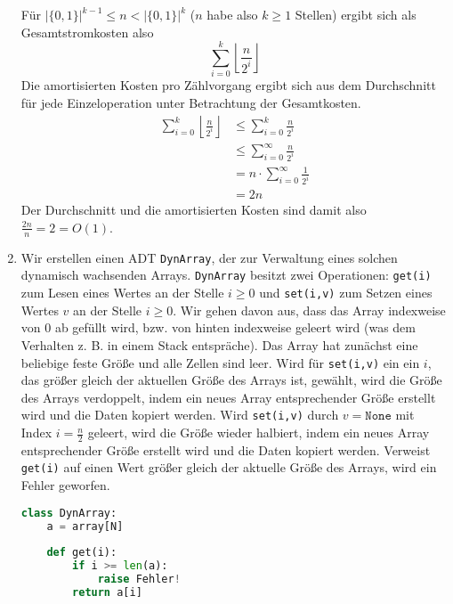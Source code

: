 \documentclass[a4paper,10pt]{article}
\begin{document}
\begin{enumerate}
        Für $\left|\{0,1\}\right|^{k-1} \leq n < \left|\{0,1\}\right|^{k}$ ($n$ habe also $k \geq 1$ Stellen) ergibt sich als Gesamtstromkosten also
        \[\sum\limits_{i=0}^{k} \left\lfloor\frac{n}{2^i}\right\rfloor\]
        Die amortisierten Kosten pro Zählvorgang ergibt sich aus dem Durchschnitt für jede Einzeloperation unter Betrachtung der Gesamtkosten.
        \begin{align*}
         \sum\limits_{i=0}^{k} \left\lfloor\frac{n}{2^i}\right\rfloor &\leq \sum\limits_{i=0}^{k} \frac{n}{2^i} \\
                                                                      &\leq \sum\limits_{i=0}^{\infty} \frac{n}{2^i} \\
                                                                      &= n \cdot \sum\limits_{i=0}^{\infty} \frac{1}{2^i} \\
                                                                      &= 2n
        \end{align*}
        Der Durchschnitt und die amortisierten Kosten sind damit also $\frac{2n}{n} = 2 = O(1)$.
\item   Wir erstellen einen ADT \texttt{DynArray}, der zur Verwaltung eines solchen dynamisch wachsenden Arrays.
        \texttt{DynArray} besitzt zwei Operationen: 
        \texttt{get(i)} zum Lesen eines Wertes an der Stelle $i \geq 0$ und \texttt{set(i,v)} zum Setzen eines Wertes $v$ an der Stelle $i \geq 0$. 
        Wir gehen davon aus, dass das Array indexweise von 0 ab gefüllt wird, bzw. von hinten indexweise geleert wird (was dem Verhalten z. B. in einem Stack entspräche).
        Das Array hat zunächst eine beliebige feste Größe und alle Zellen sind leer.
        Wird für \texttt{set(i,v)} ein ein $i$, das größer gleich der aktuellen Größe des Arrays ist, gewählt, wird die Größe des Arrays verdoppelt, indem ein neues Array entsprechender Größe erstellt wird und die Daten kopiert werden. 
        Wird \texttt{set(i,v)} durch $v = \mathtt{None}$ mit Index $i = \frac{n}{2}$ geleert, wird die Größe wieder halbiert, indem ein neues Array entsprechender Größe erstellt wird und die Daten kopiert werden.
        Verweist \texttt{get(i)} auf einen Wert größer gleich der aktuelle Größe des Arrays, wird ein Fehler geworfen.
        \begin{lstlisting}[language=Python,numbers=none]
class DynArray:
    a = array[N]
    
    def get(i):
        if i >= len(a):
            raise Fehler!
        return a[i]
    

\end{lstlisting}
\end{enumerate}
\end{document}
